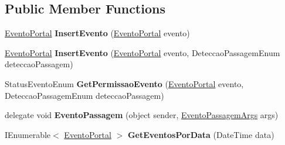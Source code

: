 \subsection*{Public Member Functions}
\begin{DoxyCompactItemize}
\item 
\hyperlink{class_cruzeiro_1_1_core_1_1_model_1_1_evento_portal}{Evento\+Portal} {\bfseries Insert\+Evento} (\hyperlink{class_cruzeiro_1_1_core_1_1_model_1_1_evento_portal}{Evento\+Portal} evento)\hypertarget{class_cruzeiro_1_1_core_1_1_bll_1_1_evento_portal_bll_a3eceb83c09124c2c2b87e7ef6ee60c55}{}\label{class_cruzeiro_1_1_core_1_1_bll_1_1_evento_portal_bll_a3eceb83c09124c2c2b87e7ef6ee60c55}

\item 
\hyperlink{class_cruzeiro_1_1_core_1_1_model_1_1_evento_portal}{Evento\+Portal} {\bfseries Insert\+Evento} (\hyperlink{class_cruzeiro_1_1_core_1_1_model_1_1_evento_portal}{Evento\+Portal} evento, Deteccao\+Passagem\+Enum deteccao\+Passagem)\hypertarget{class_cruzeiro_1_1_core_1_1_bll_1_1_evento_portal_bll_a53f8441b9b8ce7fc3d50da475ded21ca}{}\label{class_cruzeiro_1_1_core_1_1_bll_1_1_evento_portal_bll_a53f8441b9b8ce7fc3d50da475ded21ca}

\item 
Status\+Evento\+Enum {\bfseries Get\+Permissao\+Evento} (\hyperlink{class_cruzeiro_1_1_core_1_1_model_1_1_evento_portal}{Evento\+Portal} evento, Deteccao\+Passagem\+Enum deteccao\+Passagem)\hypertarget{class_cruzeiro_1_1_core_1_1_bll_1_1_evento_portal_bll_a66ad6783f42ec5b43c821070fc4cbe36}{}\label{class_cruzeiro_1_1_core_1_1_bll_1_1_evento_portal_bll_a66ad6783f42ec5b43c821070fc4cbe36}

\item 
delegate void {\bfseries Evento\+Passagem} (object sender, \hyperlink{class_cruzeiro_1_1_core_1_1_bll_1_1_evento_portal_bll_1_1_evento_passagem_args}{Evento\+Passagem\+Args} args)\hypertarget{class_cruzeiro_1_1_core_1_1_bll_1_1_evento_portal_bll_a29a584bb6d60863b51f889eb081e0f04}{}\label{class_cruzeiro_1_1_core_1_1_bll_1_1_evento_portal_bll_a29a584bb6d60863b51f889eb081e0f04}

\item 
I\+Enumerable$<$ \hyperlink{class_cruzeiro_1_1_core_1_1_model_1_1_evento_portal}{Evento\+Portal} $>$ {\bfseries Get\+Eventos\+Por\+Data} (Date\+Time data)\hypertarget{class_cruzeiro_1_1_core_1_1_bll_1_1_evento_portal_bll_ab4a465295da5fb93a638cdc8116beabc}{}\label{class_cruzeiro_1_1_core_1_1_bll_1_1_evento_portal_bll_ab4a465295da5fb93a638cdc8116beabc}

\end{DoxyCompactItemize}
